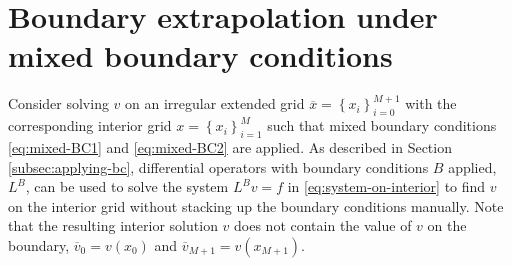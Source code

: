 \documentclass[11pt]{article}
\newcommand{\set}[1]{\ensuremath{\left\{{#1}\right\}}}
\theoremstyle{definition}
\begin{document}
\section{Boundary extrapolation under mixed boundary conditions}
Consider solving $v$ on an irregular extended grid $\overline{x} = \set{x_i}_{i=0}^{M+1}$ with the corresponding interior grid $x = \set{x_i}_{i=1}^M $ such that mixed boundary conditions \eqref{eq:mixed-BC1} and \eqref{eq:mixed-BC2} are applied. As described in Section \ref{subsec:applying-bc}, differential operators with boundary conditions $B$ applied, $L^B$, can be used to solve the system $L^B v = f$ in \eqref{eq:system-on-interior} to find $v$ on the interior grid without stacking up the boundary conditions manually. Note that the resulting interior solution $v$ does not contain the value of $v$ on the boundary, $\overline{v}_0 = v(x_0)$ and $\overline{v}_{M+1} = v(x_{M+1})$. 
\end{document}
